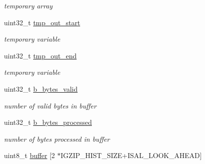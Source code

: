 \begin{DoxyCompactItemize}
\begin{DoxyCompactList}\small\item\em temporary array \end{DoxyCompactList}\item 
\hypertarget{structisal__zstate_a65a9ebba76414ada501f3acae26c53b1}{uint32\-\_\-t \hyperlink{structisal__zstate_a65a9ebba76414ada501f3acae26c53b1}{tmp\-\_\-out\-\_\-start}}\label{structisal__zstate_a65a9ebba76414ada501f3acae26c53b1}

\begin{DoxyCompactList}\small\item\em temporary variable \end{DoxyCompactList}\item 
\hypertarget{structisal__zstate_a85468e210ff1af953c6cf03963268b3f}{uint32\-\_\-t \hyperlink{structisal__zstate_a85468e210ff1af953c6cf03963268b3f}{tmp\-\_\-out\-\_\-end}}\label{structisal__zstate_a85468e210ff1af953c6cf03963268b3f}

\begin{DoxyCompactList}\small\item\em temporary variable \end{DoxyCompactList}\item 
\hypertarget{structisal__zstate_a4cf27b5f5708535fa8e286caff216e1f}{uint32\-\_\-t \hyperlink{structisal__zstate_a4cf27b5f5708535fa8e286caff216e1f}{b\-\_\-bytes\-\_\-valid}}\label{structisal__zstate_a4cf27b5f5708535fa8e286caff216e1f}

\begin{DoxyCompactList}\small\item\em number of valid bytes in buffer \end{DoxyCompactList}\item 
\hypertarget{structisal__zstate_ad504130e6f13a7c49e17b955b73c50c7}{uint32\-\_\-t \hyperlink{structisal__zstate_ad504130e6f13a7c49e17b955b73c50c7}{b\-\_\-bytes\-\_\-processed}}\label{structisal__zstate_ad504130e6f13a7c49e17b955b73c50c7}

\begin{DoxyCompactList}\small\item\em number of bytes processed in buffer \end{DoxyCompactList}\item 
\hypertarget{structisal__zstate_a78c640b0579b255e49cd3603b6549bd6}{uint8\-\_\-t \hyperlink{structisal__zstate_a78c640b0579b255e49cd3603b6549bd6}{buffer} \mbox{[}2 $\ast$I\-G\-Z\-I\-P\-\_\-\-H\-I\-S\-T\-\_\-\-S\-I\-Z\-E+I\-S\-A\-L\-\_\-\-L\-O\-O\-K\-\_\-\-A\-H\-E\-A\-D\mbox{]}}\label{structisal__zstate_a78c640b0579b255e49cd3603b6549bd6}


\end{DoxyCompactItemize}
